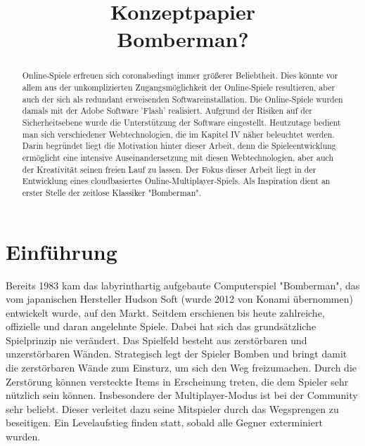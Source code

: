 \documentclass[conference]{IEEEtran}
\begin{document}
\title{Konzeptpapier\\Bomberman?}

\author{
	\and

	\and

	\and

	\and

}

\maketitle

\begin{abstract}
	Online-Spiele erfreuen sich coronabedingt immer größerer Beliebtheit. Dies könnte vor allem aus der unkomplizierten Zugangsmöglichkeit der Online-Spiele resultieren, aber auch der sich als redundant erweisenden Softwareinstallation. Die 
	Online-Spiele wurden damals mit der Adobe Software 'Flash' realisiert. Aufgrund der Risiken auf der Sicherheitsebene wurde die Unterstützung der Software eingestellt. Heutzutage bedient man sich verschiedener Webtechnologien, die im Kapitel IV näher beleuchtet werden.
	Darin begründet liegt die Motivation hinter dieser Arbeit, denn 
	die Spieleentwicklung ermöglicht eine intensive Auseinandersetzung mit diesen Webtechnologien, aber auch der Kreativität seinen freien Lauf zu lassen.
	Der Fokus dieser Arbeit liegt in der Entwicklung eines cloudbasiertes Online-Multiplayer-Spiels. Als Inspiration dient an erster Stelle der zeitlose Klassiker "Bomberman".
\end{abstract}

\section{Einführung}
Bereits 1983 kam das labyrinthartig aufgebaute Computerspiel "Bomberman", das vom japanischen Hersteller Hudson Soft (wurde 2012 von Konami übernommen) entwickelt wurde, auf den Markt. Seitdem erschienen bis heute zahlreiche, offizielle und daran angelehnte Spiele. Dabei hat sich das grundsätzliche Spielprinzip nie verändert. Das Spielfeld besteht aus zerstörbaren und unzerstörbaren Wänden. Strategisch legt der Spieler Bomben und bringt damit die zerstörbaren Wände zum Einsturz, um sich den Weg freizumachen. Durch die Zerstörung können versteckte Items in Erscheinung treten, die dem Spieler sehr nützlich sein können. Insbesondere der Multiplayer-Modus ist bei der Community sehr beliebt. Dieser verleitet dazu seine Mitspieler durch das Wegsprengen zu beseitigen. Ein Levelaufstieg finden statt, sobald alle Gegner exterminiert wurden.  
\end{document}
